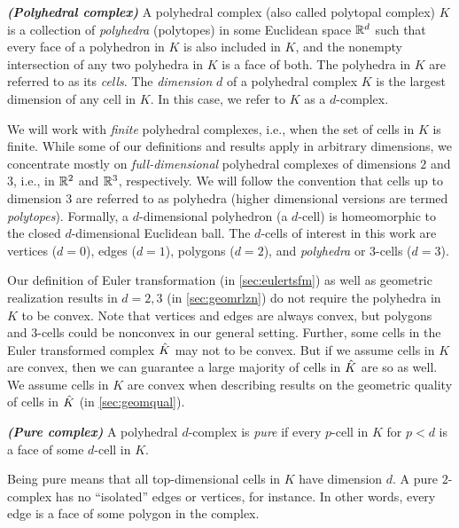 \begin{defn} \label{def:plyhdcplx}
  \emph{\bfseries (Polyhedral complex)}
  A polyhedral complex (also called polytopal complex) $K$ is a collection of \emph{polyhedra} (polytopes) in some Euclidean space ${\mathbb R}^d$ such that every face of a polyhedron in $K$ is also included in $K$, and the nonempty intersection of any two polyhedra in $K$ is a face of both.
  The polyhedra in $K$ are referred to as its \emph{cells}.
  The \emph{dimension} $d$ of a polyhedral complex $K$ is the largest dimension of any cell in $K$.
  In this case, we refer to $K$ as a $d$-complex.
\end{defn}

We will work with \emph{finite} polyhedral complexes, i.e., when the set of cells in $K$ is finite.
While some of our definitions and results apply in arbitrary dimensions, we concentrate mostly on \emph{full-dimensional} polyhedral complexes of dimensions $2$ and $3$, i.e., in ${\mathbb R}^2$ and ${\mathbb R}^3$, respectively.
We will follow the convention that cells up to dimension $3$ are referred to as polyhedra (higher dimensional versions are termed \emph{polytopes}).
Formally, a $d$-dimensional polyhedron (a $d$-cell) is homeomorphic to the closed $d$-dimensional Euclidean ball.
The $d$-cells of interest in this work are vertices ($d=0$), edges ($d=1$), polygons ($d=2$), and \emph{polyhedra} or $3$-cells ($d=3$).

Our definition of Euler transformation (in \cref{sec:eulertsfm}) as well as geometric realization results in $d=2,3$ (in \cref{sec:geomrlzn}) do not require the polyhedra in $K$ to be convex.
Note that vertices and edges are always convex, but polygons and $3$-cells could be nonconvex in our general setting.
Further, some cells in the Euler transformed complex $\hat{K}$ may not to be convex.
But if we assume cells in $K$ are convex, then we can guarantee a large majority of cells in $\hat{K}$ are so as well.
We assume cells in $K$ are convex when describing results on the geometric quality of cells in $\hat{K}$ (in \cref{sec:geomqual}).

\begin{defn} \label{def:purecplx}
  \emph{\bfseries (Pure  complex)}
  A polyhedral $d$-complex is \emph{pure} if every $p$-cell in $K$ for $p < d$ is a face of some $d$-cell in $K$.
\end{defn}
Being pure means that all top-dimensional cells in $K$ have dimension $d$.
A pure $2$-complex has no ``isolated'' edges or vertices, for instance.
In other words, every edge is a face of some polygon in the complex.

